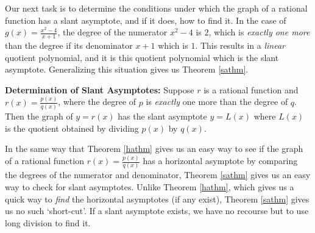 Our next task is to determine the conditions under which the graph of a rational function has a slant asymptote, and if it does, how to find it.  In the case of $g(x) = \frac{x^2-4}{x+1}$, the degree of the numerator $x^2-4$ is $2$, which is \textit{exactly one more} than the degree if its denominator $x+1$ which is $1$.  This results in a \textit{linear} quotient polynomial, and it is this quotient polynomial which is the slant asymptote.  Generalizing this situation gives us Theorem \ref{sathm}.

\begin{mthm} \textbf{Determination of Slant Asymptotes:} \label{sathm} Suppose $r$ is a rational function and $r(x) = \frac{p(x)}{q(x)}$, where the degree of $p$ is \textit{exactly} one more than the degree of $q$.  Then the graph of $y=r(x)$ has  the slant asymptote $y=L(x)$ where $L(x)$ is the quotient obtained by dividing $p(x)$ by $q(x)$.

\end{mthm}

In the same way that Theorem \ref{hathm} gives us an easy way to see if the graph of a rational function $r(x) = \frac{p(x)}{q(x)}$ has a horizontal asymptote by comparing the degrees of the numerator and denominator, Theorem \ref{sathm} gives us an easy way to check for slant asymptotes.  Unlike Theorem \ref{hathm}, which gives us a quick way to \textit{find} the horizontal asymptotes (if any exist), Theorem \ref{sathm} gives us no such `short-cut'.  If a slant asymptote exists, we have no recourse but to use long division to find it.  

